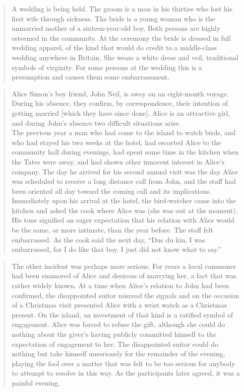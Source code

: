 \documentclass[openany,nobib]{tufte-book}
\begin{document}
\begin{quote}
A wedding is being held. The groom is a man in his thirties who lost his
first wife through sickness. The bride is a young woman who is the
unmarried mother of a sixteen-year-old boy. Both persons are highly
esteemed in the community. At the ceremony the bride is dressed in full
wedding apparel, of the kind that would do credit to a middle-class
wedding anywhere in Britain. She wears a white dress and veil,
traditional symbols of virginity. For some persons at the wedding this
is a presumption and causes them some embarrassment.
\end{quote}

\begin{quote}
Alice Simon's boy friend, John Neil, is away on an eight-month voyage.
During his absence, they confirm, by correspondence, their intention of
getting married {[}which they have since done{]}. Alice is an attractive
girl, and during John's absence two difficult situations arise.\\
The previous year a man who had come to the island to watch birds, and
who had stayed his two weeks at the hotel, had escorted Alice to the
community hall during evenings, had spent some time in the kitchen when
the Tates were away, and had shown other innocent interest in Alice's
company. The day he arrived for his second annual visit was the day
Alice was scheduled to receive a long distance call from John, and the
staff had been oriented all day toward the coming call and its
implications. Immediately upon his arrival at the hotel, the
bird-watcher came into the kitchen and asked the cook where Alice was
(she was out at the moment). His tone signified an eager expectation
that his relation with Alice would be the same, or more intimate, than
the year before. The staff felt embarrassed. As the cook said the next
day, ``Dus du kin, I was embarrassed, for I do like that boy. I just did
not know what to say.''
\end{quote}

\begin{quote}
The other incident was perhaps more serious. For years a local commoner
had been enamored of Alice and desirous of marrying her, a fact that was
rather widely known. At a time when Alice's relation to John had been
confirmed, the disappointed suitor misread the signals and on the
occasion of a Christmas visit presented Alice with a wrist watch as a
Christmas present. On the island, an investment of that kind is a
ratified symbol of engagement. Alice was forced to refuse the gift,
although she could do nothing about the giver's having publicly
committed himself to the expectation of engagement to her. The
disappointed suitor could do nothing but take himself unseriously for
the remainder of the evening, playing the fool over a matter that was
felt to be too serious for anybody to attempt to resolve in this way. As
the participants later agreed, it was a painful evening.
\end{quote}
\end{document}
